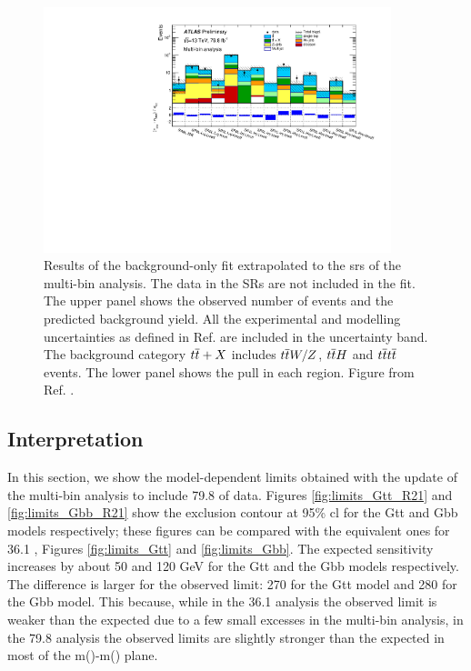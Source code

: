 \begin{figure}[htbp]
	\centering
    \includegraphics[width=0.9\textwidth]{figures/strong_prod/R21/multibin/histpull_grouping_SR.pdf}
	\caption{Results of the background-only fit extrapolated to the \glspl{sr}  of the multi-bin analysis. 
	 The data in the  SRs are not included in the fit.  
	 The upper panel shows the observed number of events and the predicted background 
	yield. All the experimental and modelling uncertainties as defined in Ref. \cite{ATLAS-CONF-2018-041} are included in the uncertainty band. 
	The background 
	category $t\overline{t}+X$ includes $t\overline{t} W/Z$, $t\overline{t} H$ and $t\overline{t} t\overline{t}$ events. The lower panel shows the 
	pull in each region.
    Figure from Ref. \cite{ATLAS-CONF-2018-041}.	 }  
	\label{fig:pullSR_R21}
\end{figure}

\FloatBarrier

\subsection{Interpretation}

In this section, we show the model-dependent limits obtained with the update of the multi-bin analysis to include 79.8 \ifb of data. 
Figures \ref{fig:limits_Gtt_R21} and \ref{fig:limits_Gbb_R21} show the exclusion contour at 95\% \gls{cl} for the Gtt and Gbb 
models respectively; these figures can be compared with the equivalent ones for 36.1 \ifb, Figures \ref{fig:limits_Gtt} and 
\ref{fig:limits_Gbb}. 
The expected sensitivity increases by about 50 and 120 GeV for the Gtt and the Gbb models respectively. 
The difference is larger for the observed limit: 270 for the Gtt model and 280 for the Gbb model. 
This because, while in the 36.1 \ifb analysis the observed limit is weaker than the expected due to 
a few small excesses in the multi-bin analysis, in the 79.8 \ifb 
analysis the observed limits are slightly stronger than the expected in most of the 
m(\gluino)-m(\ninoone) plane. 




